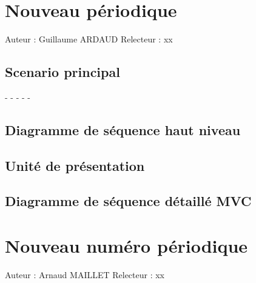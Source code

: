 \documentclass[a4paper,10pt]{report}
\begin{document}
\chapter*{Nouveau périodique}

Auteur : Guillaume ARDAUD
Relecteur : xx

\bigskip
\section*{Scenario principal}
\begin{flushleft}
-
-
-
-
-
\end{flushleft}

\bigskip

\section*{Diagramme de séquence haut niveau}

\newpage

\section*{Unité de présentation}

\section*{Diagramme de séquence détaillé MVC}

\newpage


\chapter*{Nouveau numéro périodique}

Auteur : Arnaud MAILLET
Relecteur : xx
\end{document}
